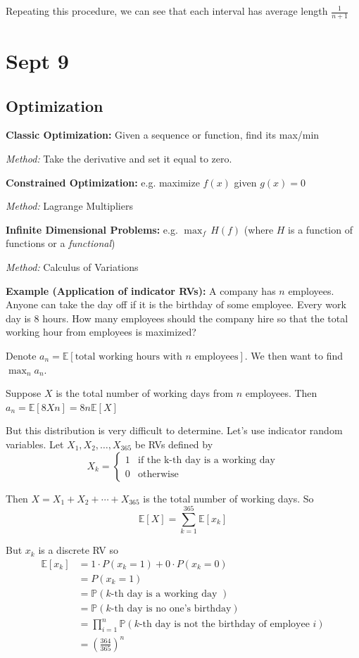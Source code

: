 \documentclass[12pt]{report}
\renewcommand{\P}{\mathbb{P}}
\newcommand{\E}{\mathbb{E}}
\begin{document}
    Repeating this procedure, we can see that each interval has average length $\frac{1}{n+1}$

\section{Sept 9}
\subsection*{Optimization}
        \textbf{Classic Optimization:} Given a sequence or function, find its max/min 

        \emph{Method:} Take the derivative and set it equal to zero.

        \textbf{Constrained Optimization:} e.g. maximize $f(x)$ given $g(x) = 0$

        \emph{Method:} Lagrange Multipliers 

        \textbf{Infinite Dimensional Problems:} e.g. $\max_f \, H(f)$ (where $H$ is a function of functions or a \emph{functional})

        \emph{Method:} Calculus of Variations
    
        \textbf{Example (Application of indicator RVs):} A company has $n$ employees. Anyone can take the day off if it is the birthday of some employee. Every work day is 8 hours. How many employees should the company hire so that the total working hour from employees is maximized? 
        
        Denote $a_n = \E[\text{total working hours with } n \text{ employees}]$. We then want to find $\max_n a_n$.

        Suppose $X$ is the total number of working days from $n$ employees. Then $a_n = \E[8Xn] = 8n\E[X]$

        But this distribution is very difficult to determine. Let's use indicator random variables. Let $X_{1}, X_2, \dots, X_{365}$ be RVs defined by 
        \[X_k = \begin{cases}
            1 & \text{if the k-th day is a working day}\\ 
            0 & \text{otherwise}
        \end{cases}\] 

        Then $X = X_1 + X_2 + \cdots + X_{365}$ is the total number of working days. So 
        \[\E[X] = \sum_{k=1}^{365} \E[x_k]\]

        But $x_k$ is a discrete RV so 
        \begin{align*}
            \E[x_k] &= 1 \cdot P(x_k = 1) + 0 \cdot P(x_k = 0)\\ 
            &= P(x_k = 1)\\ 
            &= \P(k \text{-th day is a working day })\\ 
            &= \P(k \text{-th day is no one's birthday})\\ 
            &= \prod_{i=1}^n \P(k \text{-th day is not the birthday of employee } i)\\
            &= \left(\frac{364}{365}\right)^n 
        \end{align*}
\end{document}
